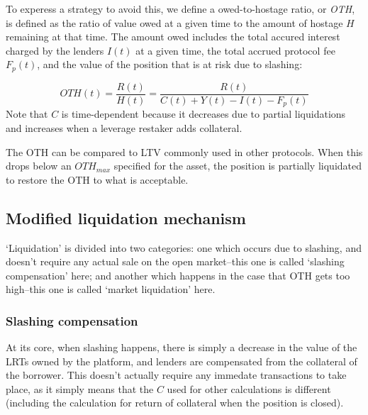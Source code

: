 \documentclass{article}
\begin{document}
To experess a strategy to avoid this, we define a owed-to-hostage ratio, or \textit{OTH}, is defined as the ratio of value owed at a given time to the amount of hostage $H$ remaining at that time. 
The amount owed includes the total accured interest charged by the lenders $I(t)$ at a given time, the total accrued protocol fee $F_p(t)$, and the value of the position that is at risk due to slashing:

$$
\textit{OTH}(t)= \frac{R(t)}{H(t)} = \frac{R(t)}{C(t) + Y(t) - I(t) - F_p(t)}
$$
Note that $C$ is time-dependent because it decreases due to partial liquidations and increases when a leverage restaker adds collateral. 


The OTH can be compared to LTV commonly used in other protocols. When this drops below an $\textit{OTH}_\textit{max}$ specified for the asset, the position is partially liquidated to restore the OTH to what is acceptable.


\subsection{Modified liquidation mechanism}
`Liquidation' is divided into two categories: one which occurs due to slashing, and doesn't require any actual sale on the open market--this one is called `slashing compensation' here; and another which happens in the case that OTH gets too high--this one is called `market liquidation' here.

\subsubsection{Slashing compensation}
At its core, when slashing happens, there is simply a decrease in the value of the LRTs owned by the platform, and lenders are compensated from the collateral of the borrower. This doesn't actually require any immedate transactions to take place, as it simply means that the $C$ used for other calculations is different (including the calculation for return of collateral when the position is closed).
\end{document}
